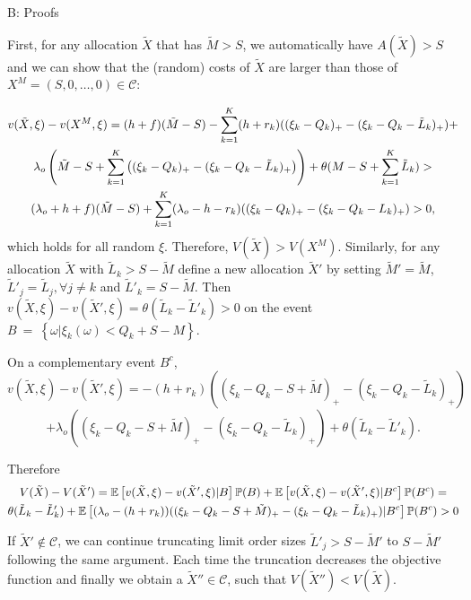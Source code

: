 \documentclass[opre,nonblindrev]{informs3}
\begin{document}
\begin{APPENDIX}{B: Proofs}

First, for any allocation $\tilde X$ that has $\tilde M>S$, we automatically have $A(\tilde X)>S$ and we can show that the (random) costs of $\tilde X$ are larger than those of $X^M=(S,0,\dots,0)\in\mathcal{C}$:

\begin{multline}
v({\tilde X},\xi) - v(X^M,\xi)=
(h+f)(\tilde M-S)-\sum_{k=1}^K(h+r_k)((\xi_k-Q_k)_+-(\xi_k-Q_k-\tilde L_k)_+)+\\ \lambda_o\left(\tilde M-S+\sum_{k=1}^K\left((\xi_k-Q_k)_+-(\xi_k-Q_k-\tilde L_k)_+\right)\right) +\theta( M-S+\sum_{k=1}^K\tilde L_k) > \\
(\lambda_o+h+f)(\tilde M-S)+\sum_{k=1}^K(\lambda_o-h-r_k)((\xi_k-Q_k)_+-(\xi_k-Q_k-L_k)_+)>0, \notag
\end{multline}
\noindent which holds for all random $\xi$. Therefore, $V(\tilde X)>V(X^M)$.
Similarly, for any allocation $\tilde X$  with $\tilde L_k>S - \tilde M$ define a new allocation $\tilde X'$ by setting $\tilde M'=\tilde M$, $\tilde L'_j=\tilde L_j, \forall j\neq k$ and $\tilde L'_k=S - \tilde M$. Then $v(\tilde X,\xi) - v(\tilde X',\xi)=\theta(\tilde L_k - \tilde L'_k) > 0$ on the event $B~=~\left\{\omega|\xi_k(\omega)<Q_k+S - M\right\}$.

On a complementary event $B^c$,
$$v(\tilde X,\xi)-v(\tilde X',\xi)=-(h+r_k)((\xi_k-Q_k-S+\tilde M)_+-(\xi_k-Q_k-\tilde L_k)_+)$$
$$+\lambda_o((\xi_k-Q_k-S+\tilde M)_+-(\xi_k-Q_k-\tilde L_k)_+)+\theta(\tilde L_k - \tilde L'_k).$$

Therefore
 \begin{multline}
V(\tilde X) - V(\tilde X') =
\mathbb{E}\left[v(\tilde X,\xi)- v(\tilde X',\xi)|B\right]\mathbb{P}(B)+
\mathbb{E}\left[v(\tilde X,\xi)-v(\tilde X',\xi)|B^c\right]\mathbb{P}(B^c) = \\ \theta(\tilde L_k - \tilde L'_k)+\mathbb{E}\left[(\lambda_o-(h+r_k))((\xi_k-Q_k-S+\tilde M)_+-(\xi_k-Q_k-\tilde L_k)_+)|B^c\right]\mathbb{P}(B^c)> 0 \notag
\end{multline}

\noindent If $\tilde X'\notin\mathcal{C}$, we can continue truncating limit order sizes $\tilde L'_j>S - \tilde M'$ to $S - \tilde M'$ following the same argument. Each time the truncation decreases the objective function and finally we obtain a $\tilde X''\in\mathcal{C}$, such that $V(\tilde X'') < V(\tilde X)$.


\end{APPENDIX}
\end{document}
